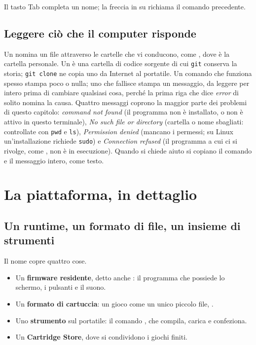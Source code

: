 \noindent Il tasto Tab completa un nome; la freccia in su richiama il comando
precedente.

\subsection{Leggere ciò che il computer risponde}

Un  nomina un file attraverso le cartelle che vi conducono, come
\allowbreak{}, dove \fname{\textasciitilde} è la
cartella personale. Un  è una cartella di codice sorgente di
cui \texttt{git} conserva la storia; \texttt{git clone} ne copia uno da Internet
al portatile. Un comando che funziona spesso stampa poco o nulla; uno che
fallisce stampa un messaggio, da leggere per intero prima di cambiare qualsiasi
cosa, perché la prima riga che dice \emph{error} di solito nomina la causa.
Quattro messaggi coprono la maggior parte dei problemi di questo capitolo:
\emph{command not found} (il programma non è installato, o non è attivo in
questo terminale), \emph{No such file or directory} (cartella o nome sbagliati:
controllate con \texttt{pwd} e \texttt{ls}), \emph{Permission denied} (mancano i
permessi; su Linux un'installazione richiede \texttt{sudo}) e \emph{Connection
refused} (il programma a cui ci si rivolge, come \prgqt, non è in esecuzione).
Quando si chiede aiuto si copiano il comando e il messaggio intero, come testo.

\section{La piattaforma, in dettaglio}

\subsection{Un runtime, un formato di file, un insieme di strumenti}

Il nome \prg copre quattro cose.

\begin{itemize}
\item Un \textbf{firmware residente}, detto anche : il programma
  che possiede lo schermo, i pulsanti e il suono.
\item Un \textbf{formato di cartuccia}: un gioco come un unico piccolo file,
  .
\item Uno \textbf{strumento} sul portatile: il comando ,
  che compila, carica e confeziona.
\item Un \textbf{Cartridge Store}, dove si condividono i giochi finiti.
\end{itemize}


